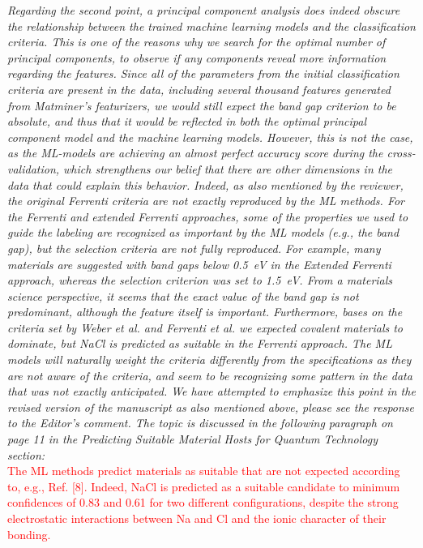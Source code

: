 \documentclass[11pt, a4paper]{letter} %
\newcommand{\mrk}[1]{\textcolor{red}{#1}}
\begin{document}
\textit{Regarding the second point, a principal component analysis does indeed obscure the relationship between the trained machine learning models and the classification criteria. This is one of the reasons why we search for the optimal number of principal components, to observe if any components reveal more information regarding the features. Since all of the parameters from the initial classification criteria are present in the data, including several thousand features generated from Matminer's featurizers, we would still expect the band gap criterion to be absolute, and thus that it  would be reflected in both the optimal principal component model and the machine learning models. However, this is not the case, as the ML-models are achieving an almost perfect accuracy score during the cross-validation, which strengthens our belief  that there are other dimensions in the data that could explain this behavior.} 
\textit{Indeed, as also mentioned by the reviewer, the original Ferrenti criteria are not exactly reproduced by the ML methods. For the Ferrenti and extended Ferrenti approaches, some of the properties we used to guide the labeling are recognized as important by the ML models (e.g., the band gap), but the selection criteria are not fully reproduced. For example, many materials are suggested with band gaps below 0.5~eV in the Extended Ferrenti approach, whereas the selection criterion was set to 1.5~eV. From a materials science perspective, it seems that the exact value of the band gap is not predominant, although the feature itself is important. Furthermore, bases on the criteria set by Weber et al. and Ferrenti et al. we expected covalent materials to dominate, but NaCl is predicted as suitable in the Ferrenti approach. The ML models will naturally weight the criteria differently from the specifications as they are not aware of the criteria, and seem to be recognizing some pattern in the data that was not exactly anticipated. We have attempted to emphasize this point in the revised version of the manuscript as also mentioned above, please see the response to the Editor's comment. The topic is discussed  in the following paragraph on page 11 in the Predicting Suitable Material Hosts for Quantum Technology  section:} \\ 
\mrk{The ML methods predict materials as suitable that are not expected according to, e.g., Ref. [8]. Indeed, NaCl is predicted as a suitable candidate to minimum confidences of 0.83 and 0.61 for two different configurations, despite the strong electrostatic interactions between Na and Cl and the ionic character of their bonding.}  \\ 
\end{document}
